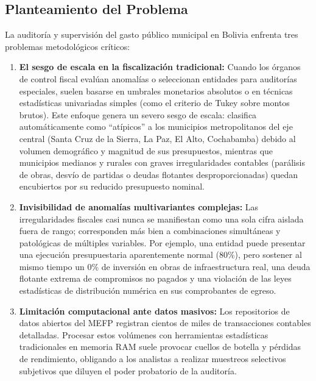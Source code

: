 \documentclass[11pt,a4paper]{article}
\begin{document}
\subsection{Planteamiento del Problema}
La auditoría y supervisión del gasto público municipal en Bolivia enfrenta tres problemas metodológicos críticos:
\begin{enumerate}[label=\textbf{\alph*)}]
    \item \textbf{El sesgo de escala en la fiscalización tradicional:} Cuando los órganos de control fiscal evalúan anomalías o seleccionan entidades para auditorías especiales, suelen basarse en umbrales monetarios absolutos o en técnicas estadísticas univariadas simples (como el criterio de Tukey sobre montos brutos). Este enfoque genera un severo sesgo de escala: clasifica automáticamente como ``atípicos'' a los municipios metropolitanos del eje central (Santa Cruz de la Sierra, La Paz, El Alto, Cochabamba) debido al volumen demográfico y magnitud de sus presupuestos, mientras que municipios medianos y rurales con graves irregularidades contables (parálisis de obras, desvío de partidas o deudas flotantes desproporcionadas) quedan encubiertos por su reducido presupuesto nominal.
    \item \textbf{Invisibilidad de anomalías multivariantes complejas:} Las irregularidades fiscales casi nunca se manifiestan como una sola cifra aislada fuera de rango; corresponden más bien a combinaciones simultáneas y patológicas de múltiples variables. Por ejemplo, una entidad puede presentar una ejecución presupuestaria aparentemente normal (80\%), pero sostener al mismo tiempo un 0\% de inversión en obras de infraestructura real, una deuda flotante extrema de compromisos no pagados y una violación de las leyes estadísticas de distribución numérica en sus comprobantes de egreso.
    \item \textbf{Limitación computacional ante datos masivos:} Los repositorios de datos abiertos del MEFP registran cientos de miles de transacciones contables detalladas. Procesar estos volúmenes con herramientas estadísticas tradicionales en memoria RAM suele provocar cuellos de botella y pérdidas de rendimiento, obligando a los analistas a realizar muestreos selectivos subjetivos que diluyen el poder probatorio de la auditoría.
\end{enumerate}
\end{document}
